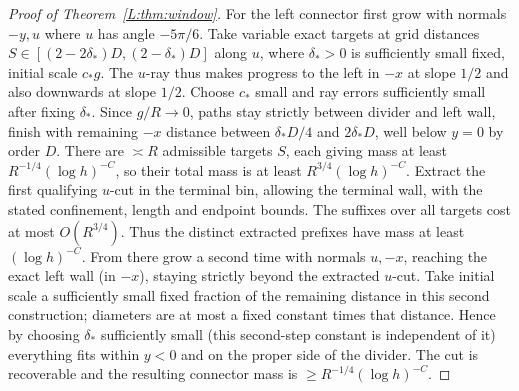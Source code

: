\documentclass[11pt]{article}
\numberwithin{equation}{section}
\theoremstyle{definition}\newtheorem{definition}[theorem]{Definition}
\theoremstyle{remark}\newtheorem{remark}[theorem]{Remark}
\begin{document}
\begin{proof}[Proof of Theorem~\ref{L:thm:window}]
For the left connector first grow with normals \(-y,u\) where \(u\) has angle \(-5\pi/6\). Take variable exact targets at grid distances \(S\in[(2-2\delta_*)D,(2-\delta_*)D]\) along \(u\), where \(\delta_*>0\) is sufficiently small fixed, initial scale \(c_* g\). The \(u\)-ray thus makes progress to the left in \(-x\) at slope \(1/2\) and also downwards at slope \(1/2\). Choose \(c_*\) small and ray errors sufficiently small after fixing \(\delta_*\). Since \(g/R\to0\), paths stay strictly between divider and left wall, finish with remaining \(-x\) distance between \(\delta_*D/4\) and \(2\delta_*D\), well below \(y=0\) by order \(D\). There are $\asymp R$ admissible targets $S$, each giving mass at least
$R^{-1/4}(\log h)^{-C}$, so their total mass is at least
$R^{3/4}(\log h)^{-C}$. Extract the first qualifying $u$-cut in the
terminal bin, allowing the terminal wall, with the stated confinement,
length and endpoint bounds. The suffixes over all targets cost at most
$O(R^{3/4})$. Thus the distinct extracted prefixes have mass at least
$(\log h)^{-C}$. From there grow a second time with normals \(u,-x\), reaching the exact left wall (in \(-x\)), staying strictly beyond the extracted \(u\)-cut. Take initial scale a sufficiently small fixed fraction of the remaining distance in this second construction; diameters are at most a fixed constant times that distance. Hence by choosing \(\delta_*\) sufficiently small (this second-step constant is independent of it) everything fits within \(y<0\) and on the proper side of the divider. The cut is recoverable and the resulting connector mass is \(\ge R^{-1/4}(\log h)^{-C}\).


\end{proof}
\end{document}
